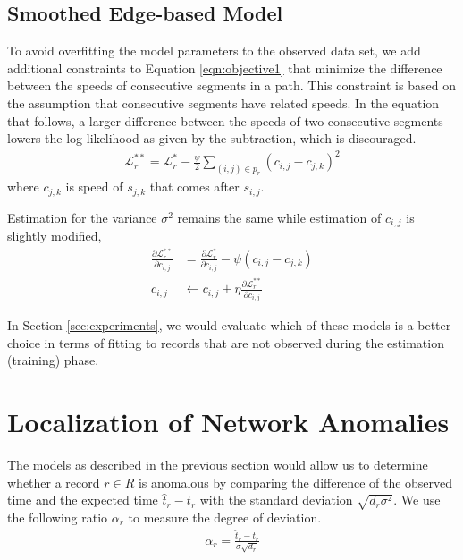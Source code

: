\documentclass[conference]{IEEEtran.1.8}
\begin{document}
\subsection{Smoothed Edge-based Model}

To avoid overfitting the model parameters to the observed data set, we add additional constraints to Equation \ref{eqn:objective1} that minimize the difference between the speeds of consecutive segments in a path. This constraint is based on the assumption that consecutive segments have related speeds. In the equation that follows, a larger difference between the speeds of two consecutive segments lowers the log likelihood as given by the subtraction, which is discouraged.
\begin{align*}
	\mathcal{L}^{**}_r = \mathcal{L}^*_r - \frac{\psi}{2} \sum_{(i,j) \in p_r} \left( c_{i,j} - c_{j,k} \right)^2
\end{align*}
where $c_{j,k}$ is speed of $s_{j,k}$ that comes after $s_{i,j}$.

Estimation for the variance $\sigma^2$ remains the same while estimation of $c_{i,j}$ is slightly modified,
\begin{align*}
	\frac{\partial \mathcal{L}^{**}_r}{\partial c_{i,j}} &= \frac{\partial \mathcal{L}^*_r}{\partial c_{i,j}} - \psi (c_{i,j} - c_{j,k}) \\
	c_{i,j} &\leftarrow c_{i,j} + \eta \frac{\partial \mathcal{L}^{**}_r}{\partial c_{i,j}}
\end{align*}

In Section \ref{sec:experiments}, we would evaluate which of these models is a better choice in terms of fitting to records that are not observed during the estimation (training) phase.

\section{Localization of Network Anomalies}
\label{sec:localization}

The models as described in the previous section would allow us to determine whether a record $r \in R$ is anomalous by comparing the difference of the observed time and the expected time $\hat{t}_r - t_r$ with the standard deviation $\sqrt{d_r \sigma^2}$. We use the following ratio $\alpha_r$ to measure the degree of deviation.
\begin{align}
	\label{eqn:alpha_ratio}
	\alpha_r = \frac{\hat{t}_r - t_r}{\sigma \sqrt{d_r}}
\end{align}
\end{document}
